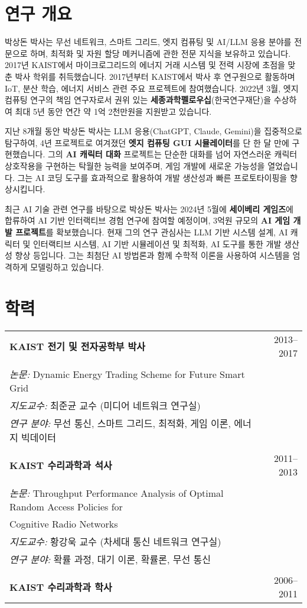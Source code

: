 \documentclass[11pt,a4paper]{article}
\begin{document}
\section{연구 개요}

박상돈 박사는 무선 네트워크, 스마트 그리드, 엣지 컴퓨팅 및 AI/LLM 응용 분야를 전문으로 하며, 최적화 및 자원 할당 메커니즘에 관한 전문 지식을 보유하고 있습니다. 2017년 KAIST에서 마이크로그리드의 에너지 거래 시스템 및 전력 시장에 초점을 맞춘 박사 학위를 취득했습니다. 2017년부터 KAIST에서 박사 후 연구원으로 활동하며 IoT, 분산 학습, 에너지 서비스 관련 주요 프로젝트에 참여했습니다. 2022년 3월, 엣지 컴퓨팅 연구의 책임 연구자로서 권위 있는 \textbf{세종과학펠로우십}(한국연구재단)을 수상하여 최대 5년 동안 연간 약 1억 2천만원을 지원받고 있습니다.

지난 8개월 동안 박상돈 박사는 LLM 응용(ChatGPT, Claude, Gemini)을 집중적으로 탐구하여, 4년 프로젝트로 여겨졌던 \textbf{엣지 컴퓨팅 GUI 시뮬레이터}를 단 한 달 만에 구현했습니다. 그의 \textbf{AI 캐릭터 대화} 프로젝트는 단순한 대화를 넘어 자연스러운 캐릭터 상호작용을 구현하는 탁월한 능력을 보여주며, 게임 개발에 새로운 가능성을 열었습니다. 그는 AI 코딩 도구를 효과적으로 활용하여 개발 생산성과 빠른 프로토타이핑을 향상시킵니다.

최근 AI 기술 관련 연구를 바탕으로 박상돈 박사는 2024년 5월에 \textbf{세이베리 게임즈}에 합류하여 AI 기반 인터랙티브 경험 연구에 참여할 예정이며, 3억원 규모의 \textbf{AI 게임 개발 프로젝트}를 확보했습니다. 현재 그의 연구 관심사는 LLM 기반 시스템 설계, AI 캐릭터 및 인터랙티브 시스템, AI 기반 시뮬레이션 및 최적화, AI 도구를 통한 개발 생산성 향상 등입니다. 그는 최첨단 AI 방법론과 함께 수학적 이론을 사용하여 시스템을 엄격하게 모델링하고 있습니다.

\section{학력}

\begin{tabular}{p{14cm}r}
\textbf{KAIST 전기 및 전자공학부 박사} & 2013--2017 \\
\\
\textit{논문:} Dynamic Energy Trading Scheme for Future Smart Grid & \\
\textit{지도교수:} 최준균 교수 (미디어 네트워크 연구실) & \\
\textit{연구 분야:} 무선 통신, 스마트 그리드, 최적화, 게임 이론, 에너지 빅데이터 & \\
\\
\textbf{KAIST 수리과학과 석사} & 2011--2013 \\
\\
\textit{논문:} Throughput Performance Analysis of Optimal Random Access Policies for & \\
Cognitive Radio Networks & \\
\textit{지도교수:} 황강욱 교수 (차세대 통신 네트워크 연구실) & \\
\textit{연구 분야:} 확률 과정, 대기 이론, 확률론, 무선 통신 & \\
\\
\textbf{KAIST 수리과학과 학사} & 2006--2011 \\
\end{tabular}
\end{document}
